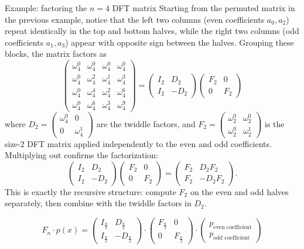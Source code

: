 \begin{examplebox}{Example: factoring the $n=4$ DFT matrix}
Starting from the permuted matrix in the previous example, notice that the left two columns
(even coefficients $a_0, a_2$) repeat identically in the top and bottom halves, while the right two columns
(odd coefficients $a_1, a_3$) appear with opposite sign between the halves.
Grouping these blocks, the matrix factors as
$$
\left(\begin{array}{cc|cc}
  \omega_4^0 & \omega_4^0 & \omega_4^0 & \omega_4^0 \\
  \omega_4^0 & \omega_4^2 & \omega_4^1 & \omega_4^3 \\
  \hline
  \omega_4^0 & \omega_4^4 & \omega_4^2 & \omega_4^6 \\
  \omega_4^0 & \omega_4^6 & \omega_4^3 & \omega_4^9
\end{array}\right)
=
\begin{pmatrix} I_2 & D_2 \\ I_2 & -D_2 \end{pmatrix}
\begin{pmatrix} F_2 & 0 \\ 0 & F_2 \end{pmatrix}
$$
where $D_2 = \begin{pmatrix} \omega_4^0 & 0 \\ 0 & \omega_4^1 \end{pmatrix}$ are the twiddle factors, and
$F_2 = \begin{pmatrix} \omega_2^0 & \omega_2^0 \\ \omega_2^0 & \omega_2^1 \end{pmatrix}$
is the size-2 DFT matrix applied independently to the even and odd coefficients.
Multiplying out confirms the factorization:
$$
\begin{pmatrix} I_2 & D_2 \\ I_2 & -D_2 \end{pmatrix}
\begin{pmatrix} F_2 & 0 \\ 0 & F_2 \end{pmatrix}
=
\begin{pmatrix} F_2 & D_2 F_2 \\ F_2 & -D_2 F_2 \end{pmatrix}.
$$
This is exactly the recursive structure: compute $F_2$ on the even and odd halves separately, then combine with the twiddle factors in $D_2$.
\end{examplebox}


$$
F_n \cdot p(x) =
\begin{pmatrix}
  I_{ \frac{n}{2}} & D_{\frac{n}{2}} \\
  I_{ \frac{n}{2}} & -D_{\frac{n}{2}}
 \end{pmatrix}
 \cdot 
 \begin{pmatrix}
  F_{ \frac{n}{2}} & 0 \\
  0 & F_{ \frac{n}{2}} 
\end{pmatrix}
\cdot 
\begin{pmatrix}
  p_{\text{even coefficient}} \\
  p_{\text{odd coefficient}}
\end{pmatrix}
 $$

